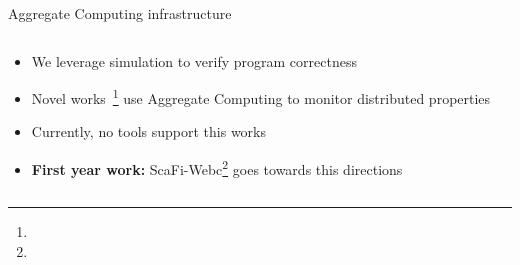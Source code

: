 \begin{frame}{Aggregate Computing infrastructure}
  \begin{columns}[onlytextwidth]
    \begin{column}{0.45\textwidth}
      \begin{card}
        \begin{itemize}
          \item We leverage simulation to verify program correctness
          \item Novel works~\footnote[frame]{} use Aggregate Computing to monitor distributed properties
          \item Currently, no tools support this works
          \item \textbf{First year work:} ScaFi-Webc\footnote[frame]{} goes towards this directions
        \end{itemize}
      \end{card}
    \end{column}
    \begin{column}{0.5\textwidth}
    \end{column}
  \end{columns}
\end{frame}